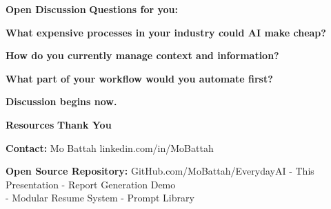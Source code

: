 \documentclass[
  ignorenonframetext,
  aspectratio=169,
]{beamer}
\begin{document}
\begin{frame}{\textbf{Open Discussion}}
\label{open-discussion}
\textbf{Questions for you:}

\textbf{What expensive processes in your industry could AI make cheap?}

\textbf{How do you currently manage context and information?}

\textbf{What part of your workflow would you automate first?}

\textbf{Discussion begins now.}
\end{frame}

\begin{frame}{\textbf{Resources}}
\label{resources}
\textbf{Thank You}

\textbf{Contact:} Mo Battah \textbar{} linkedin.com/in/MoBattah

\textbf{Open Source Repository:} GitHub.com/MoBattah/EverydayAI - This
Presentation - Report Generation Demo\\
- Modular Resume System - Prompt Library
\end{frame}
\end{document}
